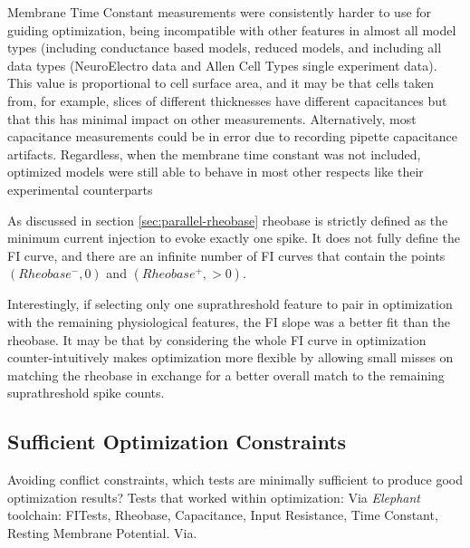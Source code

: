 Membrane Time Constant measurements were consistently harder to use for guiding optimization, being incompatible with other features in almost all model types (including conductance based models, reduced models, and including all data types (NeuroElectro data and Allen Cell Types single experiment data).
This value is proportional to cell surface area, and it may be that cells taken from, for example, slices of different thicknesses have different capacitances but that this has minimal impact on other measurements.
Alternatively, most capacitance measurements could be in error due to recording pipette capacitance artifacts.
Regardless, when the membrane time constant was not included, optimized models were still able to behave in most other respects like their experimental counterparts

As discussed in section \ref{sec:parallel-rheobase} rheobase is strictly defined as the minimum current injection to evoke exactly one spike.
It does not fully define the FI curve, and there are an infinite number of FI curves that contain the points $(Rheobase^-, 0)$ and $(Rheobase^+, >0)$.

%

Interestingly, if selecting only one suprathreshold feature to pair in optimization with the remaining physiological features, the FI slope was a better fit than the rheobase.
It may be that by considering the whole FI curve in optimization counter-intuitively makes optimization more flexible by allowing small misses on matching the rheobase in exchange for a better overall match to the remaining suprathreshold spike counts.

\subsection{Sufficient Optimization Constraints}
Avoiding conflict constraints, which tests are minimally sufficient to produce good optimization results?
Tests that worked within optimization:
Via \emph{Elephant} toolchain: FITests, Rheobase, Capacitance, Input Resistance, Time Constant, Resting Membrane Potential.
Via. 

